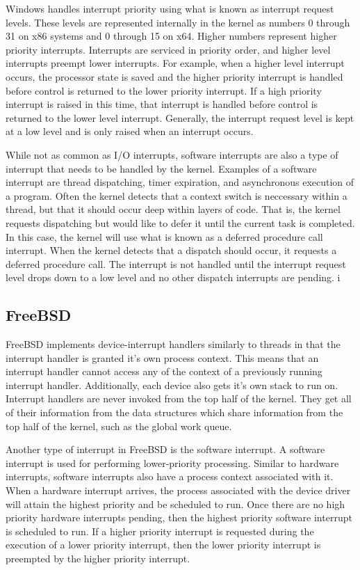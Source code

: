 \documentclass[journal,letterpaper,draftclsnofoot,onecolumn,10pt]{IEEEtran}
\begin{document}
Windows handles interrupt priority using what is known as interrupt request levels. These levels are represented internally in the kernel as numbers 0 through 31 on x86 systems and 0 through 15 on x64. Higher numbers represent higher priority interrupts. Interrupts are serviced in priority order, and higher level interrupts preempt lower interrupts. For example, when a higher level interrupt occurs, the processor state is saved and the higher priority interrupt is handled before control is returned to the lower priority interrupt. If a high priority interrupt is raised in this time, that interrupt is handled before control is returned to the lower level interrupt. Generally, the interrupt request level is kept at a low level and is only raised when an interrupt occurs.\cite{1ris12}

While not as common as I/O interrupts, software interrupts are also a type of interrupt that needs to be handled by the kernel. Examples of a software interrupt are thread dispatching, timer expiration, and asynchronous execution of a program. Often the kernel detects that a context switch is neccessary within a thread, but that it should occur deep within layers of code. That is, the kernel requests dispatching but would like to defer it until the current task is completed. In this case, the kernel will use what is known as a deferred procedure call interrupt. When the kernel detects that a dispatch should occur, it requests a deferred procedure call. The interrupt is not handled until the interrupt request level drops down to a low level and no other dispatch interrupts are pending.\cite{1ris12}
i

\subsection{FreeBSD}

FreeBSD implements device-interrupt handlers similarly to threads in that the interrupt handler is granted it's own process context. This means that an interrupt handler cannot access any of the context of a previously running interrupt handler. Additionally, each device also gets it's own stack to run on. Interrupt handlers are never invoked from the top half of the kernel. They get all of their information from the data structures which share information from the top half of the kernel, such as the global work queue.\cite{mn15}

Another type of interrupt in FreeBSD is the software interrupt. A software interrupt is used for performing lower-priority processing. Similar to hardware interrupts, software interrupts also have a process context associated with it. When a hardware interrupt arrives, the process associated with the device driver will attain the highest priority and be scheduled to run. Once there are no high priority hardware interrupts pending, then the highest priority software interrupt is scheduled to run. If a higher priority interrupt is requested during the execution of a lower priority interrupt, then the lower priority interrupt is preempted by the higher priority interrupt.\cite{mn15}
\end{document}
